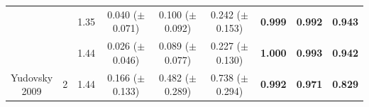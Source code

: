 \begin{subappendices}
\begin{table}[bhp]
\begin{tabular}{|cc|c|ccc|ccc|}
        & & 1.35 & \shortstack{0.040 \\($\pm$ 0.071)} & \shortstack{0.100 \\($\pm$ 0.092)} & \shortstack{0.242 \\($\pm$ 0.153)} & \textbf{0.999} & \textbf{0.992} & \textbf{0.943} \\
        & & 1.44 & \shortstack{0.026 \\($\pm$ 0.046)} & \shortstack{0.089 \\($\pm$ 0.077)} & \shortstack{0.227 \\($\pm$ 0.130)} & \textbf{1.000} & \textbf{0.993} & \textbf{0.942} \\
        \hline
        \shortstack{Yudovsky\\ 2009} & 2 & 1.44 & \shortstack{0.166 \\($\pm$ 0.133)} & \shortstack{0.482 \\($\pm$ 0.289)} & \shortstack{0.738 \\($\pm$ 0.294)} & \textbf{0.992} & \textbf{0.971} & \textbf{0.829} \\
        \hline
    \end{tabular}
    \label{ap:forwardsHSIMCq}
\end{table}
\FloatBarrier


\end{subappendices}
